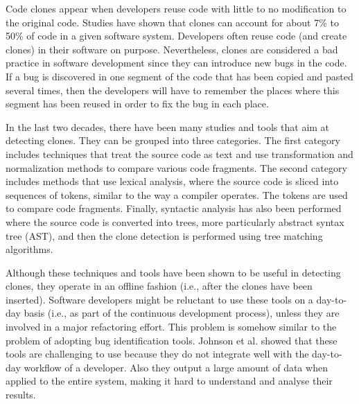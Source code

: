 \documentclass[conference]{IEEEtran}
\begin{document}
Code clones appear when developers reuse code with little to no modification to the original code.
Studies have shown  that clones can account for about 7\% to 50\% of code in a given software system\cite{Baker, StephaneDucasse}.
Developers often reuse code (and create clones) in their software on purpose\cite{Kim2005}.
Nevertheless, clones are considered a bad practice in software development since they can introduce new bugs in the code\cite{Kapser2006,Juergens2009,Li2006}.
If a  bug is discovered in one segment of the code that has been copied and pasted several times, then the developers will have to remember the places where this segment has been reused in order to fix the bug in each place.

In the last two decades, there have been many studies and tools that aim at detecting clones. They can be grouped into three categories.
The first category includes techniques that treat the source code as text and use transformation and normalization methods to compare various code fragments\cite{Johnson1994,Johnson1993, Cordy2011, Roy2008}.
The second category includes methods that
use lexical analysis, where the source code is sliced into sequences of tokens, similar to the way a compiler operates\cite{Baker,Bakera,Baker2002,Kamiya2002,Li2006}.
The tokens are used to compare code fragments.
Finally, syntactic analysis has also been performed where the source code is converted into trees, more particularly abstract syntax tree (AST), and then the clone detection is performed using tree matching algorithms\cite{Baxter1998, Komondoor2000, Tairas2006, Falke2008}.

Although these techniques and tools have been shown to be useful in detecting clones, they operate in an offline fashion (i.e., after the clones have been inserted). Software developers might be reluctant to use these tools on a day-to-day basis (i.e., as part of the continuous development process), unless they are involved in a major refactoring effort. This problem is somehow similar to the problem of adopting bug identification tools. Johnson et al. \cite{Johnson2013} showed that these tools are challenging to use because they do not integrate well with the day-to-day workflow of a developer. Also they output a large amount of data when applied to the entire system, making it hard to understand and analyse their results.
\end{document}
